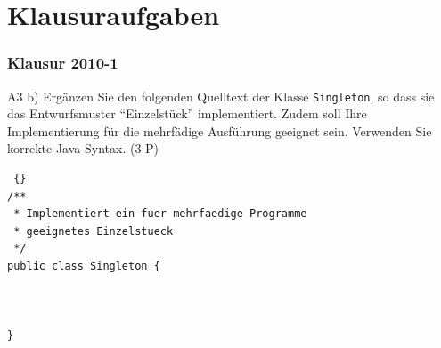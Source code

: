 
\section{Klausuraufgaben}
\begin{frame}[fragile]
\frametitle {Klausur 2010-1} 
	\begin{block} {A3 b)}
	Ergänzen Sie den folgenden Quelltext der Klasse \texttt{Singleton}, so dass sie das Entwurfsmuster ``Einzelstück'' implementiert. Zudem soll Ihre Implementierung für die mehrfädige Ausführung geeignet sein. Verwenden Sie korrekte Java-Syntax. (3 P)
	\end{block}
	
	\begin{lstlisting} {}
/**
 * Implementiert ein fuer mehrfaedige Programme 
 * geeignetes Einzelstueck
 */
public class Singleton {



}
	\end{lstlisting}
\end{frame}

